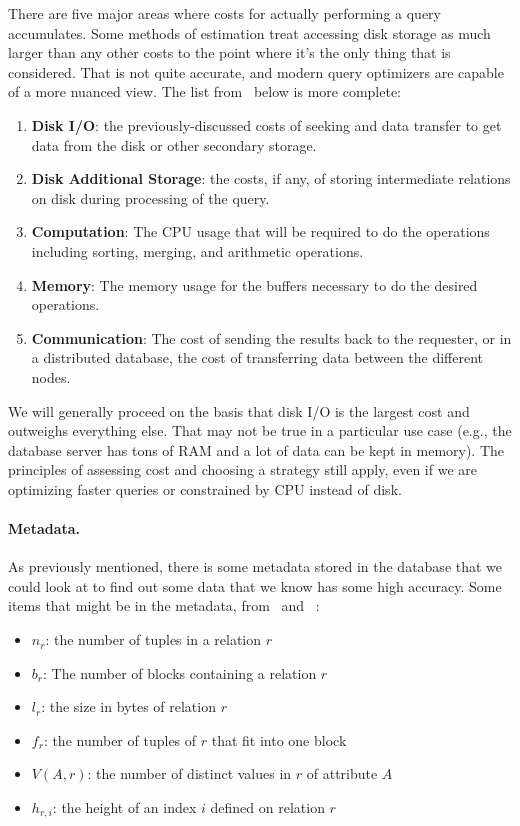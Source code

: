 There are five major areas where costs for actually performing a query accumulates. Some methods of estimation treat accessing disk storage as much larger than any other costs to the point where it's the only thing that is considered. That is not quite accurate, and modern query optimizers are capable of a more nuanced view. The list from~\cite{fds} below is more complete:

\begin{enumerate}
	\item \textbf{Disk I/O}: the previously-discussed costs of seeking and data transfer to get data from the disk or other secondary storage.
	\item \textbf{Disk Additional Storage}: the costs, if any, of storing intermediate relations on disk during processing of the query.
	\item \textbf{Computation}: The CPU usage that will be required to do the operations including sorting, merging, and arithmetic operations.
	\item \textbf{Memory}: The memory usage for the buffers necessary to do the desired operations.
	\item \textbf{Communication}: The cost of sending the results back to the requester, or in  a distributed database, the cost of transferring data between the different nodes.
\end{enumerate}

We will generally proceed on the basis that disk I/O is the largest cost and outweighs everything else. That may not be true in a particular use case (e.g., the database server has tons of RAM and a lot of data can be kept in memory). The principles of assessing cost and choosing a strategy still apply, even if we are optimizing faster queries or constrained by CPU instead of disk.

\paragraph{Metadata.} As previously mentioned, there is some metadata stored in the database that we could look at to find out some data that we know has some high accuracy. Some items that might be in the metadata, from~\cite{dsc} and ~\cite{fds}:

\begin{itemize}
	\item $n_{r}$: the number of tuples in a relation $r$ 
	\item $b_{r}$: The number of blocks containing a relation $r$ 
	\item $l_{r}$: the size in bytes of relation $r$
	\item $f_{r}$: the number of tuples of $r$ that fit into one block
	\item $V(A, r)$: the number of distinct values in $r$ of attribute $A$
	\item $h_{r, i}$: the height of an index $i$ defined on relation $r$
\end{itemize}

